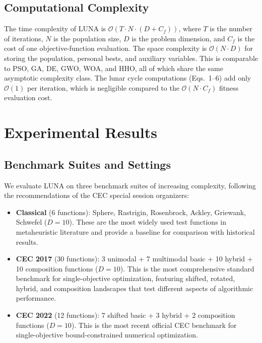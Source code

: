 \documentclass[11pt,a4paper]{article}
\begin{document}
\subsection{Computational Complexity}

The time complexity of LUNA is $\mathcal{O}(T \cdot N \cdot (D + C_f))$, where $T$ is the number of iterations, $N$ is the population size, $D$ is the problem dimension, and $C_f$ is the cost of one objective-function evaluation. The space complexity is $\mathcal{O}(N \cdot D)$ for storing the population, personal bests, and auxiliary variables. This is comparable to PSO, GA, DE, GWO, WOA, and HHO, all of which share the same asymptotic complexity class. The lunar cycle computations (Eqs.~1--6) add only $\mathcal{O}(1)$ per iteration, which is negligible compared to the $\mathcal{O}(N \cdot C_f)$ fitness evaluation cost.

\section{Experimental Results}\label{sec:results}

\subsection{Benchmark Suites and Settings}

We evaluate LUNA on three benchmark suites of increasing complexity, following the recommendations of the CEC special session organizers:
\begin{itemize}[leftmargin=1.5em]
\item \textbf{Classical} (6 functions): Sphere, Rastrigin, Rosenbrock, Ackley, Griewank, Schwefel ($D=10$). These are the most widely used test functions in metaheuristic literature and provide a baseline for comparison with historical results.
\item \textbf{CEC 2017} (30 functions): 3 unimodal + 7 multimodal basic + 10 hybrid + 10 composition functions ($D=10$). This is the most comprehensive standard benchmark for single-objective optimization, featuring shifted, rotated, hybrid, and composition landscapes that test different aspects of algorithmic performance.
\item \textbf{CEC 2022} (12 functions): 7 shifted basic + 3 hybrid + 2 composition functions ($D=10$). This is the most recent official CEC benchmark for single-objective bound-constrained numerical optimization.
\end{itemize}
\end{document}
